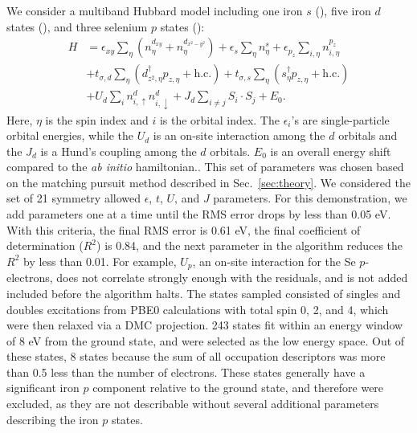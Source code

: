 We consider a multiband Hubbard model including one iron $s$ (), five iron $d$ states (), and three selenium $p$ states ():
\begin{align}
  H 
  &=
  \epsilon_{xy} \sum_{\eta} (n^{d_{xy}}_{\eta}  + n^{d_{x^2-y^2}}_{\eta})
  +
  \epsilon_s \sum_{\eta} n^{s}_{\eta} 
  +
  \epsilon_{p_{z}} \sum_{i,\eta} n^{p_{z}}_{i,\eta} 
  \nonumber \\
  &+ 
  t_{\sigma,d} \sum_{\eta} \left( d_{z^2,\eta}^{\dagger} p_{z,\eta} + \text{h.c.} \right)
  +
  t_{\sigma,s} \sum_{\eta} \left(s_{\eta}^{\dagger}  p_{z,\eta} + \text{h.c.} \right)
  \nonumber \\
  &+
  U_d \sum_{i} n^{d}_{i,\uparrow} n^{d}_{i,\downarrow} 
  +
  J_d \sum_{i\ne j} S_i \cdot S_j
  +
  E_0. \label{eq:fesemodel}
\end{align}
Here, $\eta$ is the spin index and $i$ is the orbital index.
The $\epsilon_i$'s are single-particle orbital energies, while the $U_d$ is an on-site interaction among the $d$ orbitals and the $J_d$ is a Hund's coupling among the $d$ orbitals.
$E_0$ is an overall energy shift compared to the \textit{ab initio} hamiltonian..
This set of parameters was chosen based on the matching pursuit method described in Sec.~\ref{sec:theory}.
We considered the set of 21 symmetry allowed $\epsilon$, $t$, $U$, and $J$ parameters.  
For this demonstration, we add parameters one at a time until the RMS error drops by less than 0.05 eV. 
With this criteria,   the final RMS error is 0.61 eV, the final coefficient of determination ($R^2$) is 0.84, and the next parameter in the algorithm reduces the $R^2$ by less than 0.01. 
For example, $U_p$, an on-site interaction for the Se $p$-electrons, does not correlate strongly enough with the residuals, and is not added included before the algorithm halts.
The states sampled consisted of singles and doubles excitations from PBE0 calculations with total spin 0, 2, and 4, which were then relaxed via a DMC projection.
243 states fit within an energy window of 8 eV from the ground state, and were selected as the low energy space.
Out of these states, 8 states because the sum of all occupation descriptors was more than 0.5 less than the number of electrons.
These states generally have a significant iron $p$ component relative to the ground state, and therefore were excluded, as they are not describable without several additional parameters describing the iron $p$ states.

